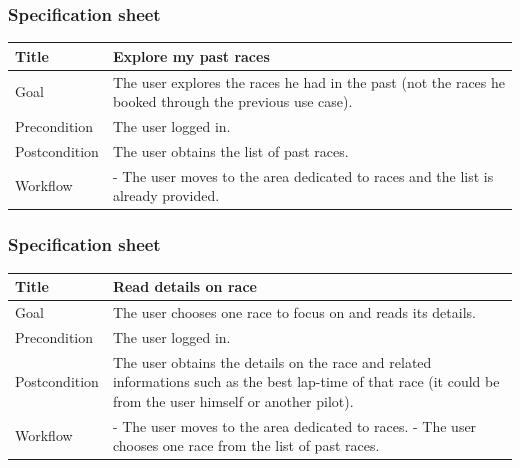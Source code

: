 \documentclass{beamer}
\begin{document}
\begin{frame}
    \frametitle{Specification sheet}
    \begin{table}
        \tiny
        \begin{tabular}{|p{2cm}|p{6cm}|}
        \hline
        Title & \textbf{Explore my past races} \\
        \hline
        Goal & The user explores the races he had in the past (not the races he booked through the previous 
        use case). \\
        \hline
        Precondition & The user logged in. \\
        \hline  
        Postcondition & The user obtains the list of past races. \\
        \hline
        Workflow &
        - The user moves to the area dedicated to races
        and the list is already provided. \\
        \hline
        \end{tabular}
\end{table}
\end{frame}

\begin{frame}
    \frametitle{Specification sheet}
    \begin{table}
        \tiny
        \begin{tabular}{|p{2cm}|p{6cm}|}
        \hline
        Title & \textbf{Read details on race} \\
        \hline
        Goal & The user chooses one race to focus on and reads its details. \\
        \hline
        Precondition & The user logged in. \\
        \hline
        Postcondition & The user obtains the details on the race and related informations such as the best lap-time of
        that race (it could be from the user himself or another pilot). \\
        \hline
        Workflow &
        - The user moves to the area dedicated to races. \newline
        - The user chooses one race from the list of past races. \\
        \hline
        \end{tabular}
\end{table}
\end{frame}
\end{document}
